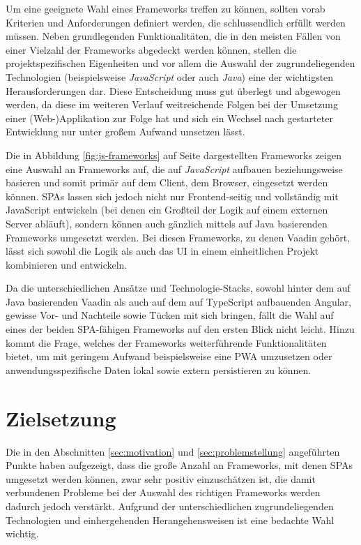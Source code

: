 \documentclass[a4paper,12pt,twoside]{scrreprt}
\begin{document}
Um eine geeignete Wahl eines Frameworks treffen zu können, sollten vorab Kriterien und Anforderungen definiert werden, die schlussendlich erfüllt werden müssen. Neben grundlegenden Funktionalitäten, die in den meisten Fällen von einer Vielzahl der Frameworks abgedeckt werden können, stellen die projektspezifischen Eigenheiten und vor allem die Auswahl der zugrundeliegenden Technologien (beispielsweise \textit{JavaScript} oder auch \textit{Java}) eine der wichtigsten Herausforderungen dar. Diese Entscheidung muss gut überlegt und abgewogen werden, da diese im weiteren Verlauf weitreichende Folgen bei der Umsetzung einer (Web-)Applikation zur Folge hat und sich ein Wechsel nach gestarteter Entwicklung nur unter großem Aufwand umsetzen lässt.

Die in Abbildung \ref{fig:js-frameworks} auf Seite \pageref{fig:js-frameworks} dargestellten Frameworks zeigen eine Auswahl an Frameworks auf, die auf \textit{JavaScript} aufbauen beziehungsweise basieren und somit primär auf dem Client, dem Browser, eingesetzt werden können. \acp{SPA} lassen sich jedoch nicht nur Frontend-seitig und vollständig mit JavaScript entwickeln (bei denen ein Großteil der Logik auf einem externen Server abläuft), sondern können auch gänzlich mittels auf Java basierenden Frameworks umgesetzt werden. Bei diesen Frameworks, zu denen Vaadin gehört, lässt sich sowohl die Logik als auch das \ac{UI} in einem einheitlichen Projekt kombinieren und entwickeln.

Da die unterschiedlichen Ansätze und Technologie-Stacks, sowohl hinter dem auf Java basierenden Vaadin als auch auf dem auf TypeScript aufbauenden Angular, gewisse Vor- und Nachteile sowie Tücken mit sich bringen, fällt die Wahl auf eines der beiden \ac{SPA}-fähigen Frameworks auf den ersten Blick nicht leicht. Hinzu kommt die Frage, welches der Frameworks weiterführende Funktionalitäten bietet, um mit geringem Aufwand beispielsweise eine \ac{PWA} umzusetzen oder anwendungsspezifische Daten lokal sowie extern persistieren zu können.

\section{Zielsetzung}
\label{sec:zielsetzung}
Die in den Abschnitten \ref{sec:motivation} und \ref{sec:problemstellung} angeführten Punkte haben aufgezeigt, dass die große Anzahl an Frameworks, mit denen \acp{SPA} umgesetzt werden können, zwar sehr positiv einzuschätzen ist, die damit verbundenen Probleme bei der Auswahl des richtigen Frameworks werden dadurch jedoch verstärkt. Aufgrund der unterschiedlichen zugrundeliegenden Technologien und einhergehenden Herangehensweisen ist eine bedachte Wahl wichtig.
\end{document}
